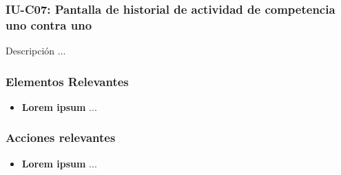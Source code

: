
\subsubsection{IU-C07: Pantalla de historial de actividad de competencia uno contra uno}

 Descripción ...


\subsubsection{Elementos Relevantes}

    \begin{itemize}
    \item {\bf Lorem ipsum}
        ...
    \end{itemize}

\subsubsection{Acciones relevantes}

    \begin{itemize}
    \item {\bf Lorem ipsum}
        ...
    \end{itemize}

\clearpage
